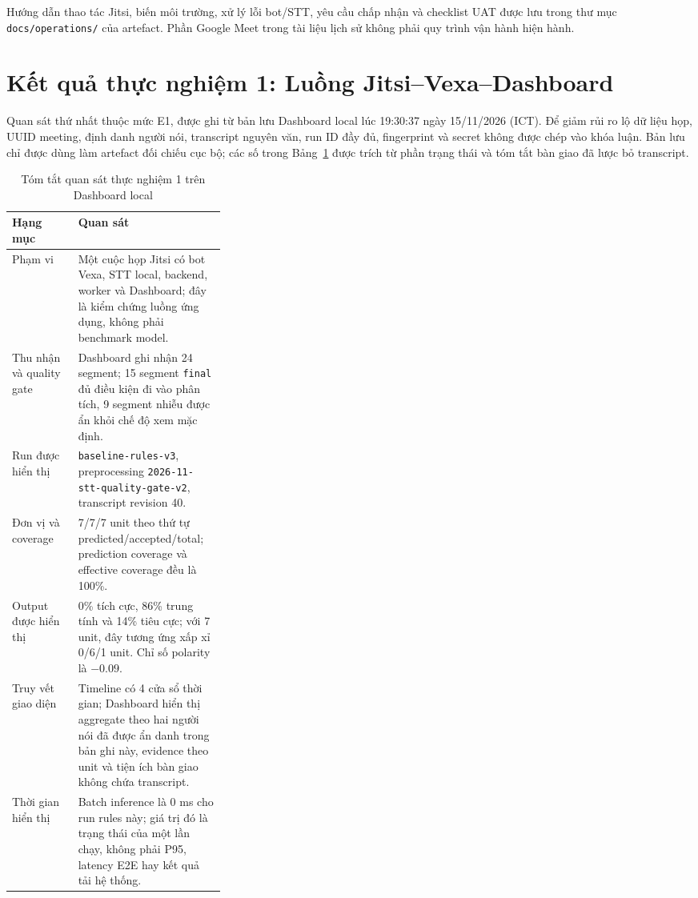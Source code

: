 Hướng dẫn thao tác Jitsi, biến môi trường, xử lý lỗi bot/STT, yêu cầu chấp nhận và checklist UAT được lưu trong thư mục \texttt{docs/operations/} của artefact. Phần Google Meet trong tài liệu lịch sử không phải quy trình vận hành hiện hành.

\section{Kết quả thực nghiệm 1: Luồng Jitsi--Vexa--Dashboard}
\label{sec:experiment-result-01}

Quan sát thứ nhất thuộc mức E1, được ghi từ bản lưu Dashboard local lúc 19:30:37 ngày 15/11/2026 (ICT). Để giảm rủi ro lộ dữ liệu họp, UUID meeting, định danh người nói, transcript nguyên văn, run ID đầy đủ, fingerprint và secret không được chép vào khóa luận. Bản lưu chỉ được dùng làm artefact đối chiếu cục bộ; các số trong Bảng~\ref{tab:experiment-result-01} được trích từ phần trạng thái và tóm tắt bàn giao đã lược bỏ transcript.

\begin{table}[H]
\centering
\caption{Tóm tắt quan sát thực nghiệm 1 trên Dashboard local}
\label{tab:experiment-result-01}
\begin{tabularx}{\linewidth}{p{0.31\linewidth}X}
\toprule
Hạng mục & Quan sát \\ \midrule
Phạm vi & Một cuộc họp Jitsi có bot Vexa, STT local, backend, worker và Dashboard; đây là kiểm chứng luồng ứng dụng, không phải benchmark model. \\
Thu nhận và quality gate & Dashboard ghi nhận 24 segment; 15 segment \texttt{final} đủ điều kiện đi vào phân tích, 9 segment nhiễu được ẩn khỏi chế độ xem mặc định. \\
Run được hiển thị & \texttt{baseline-rules-v3}, preprocessing \texttt{2026-11-stt-quality-gate-v2}, transcript revision 40. \\
Đơn vị và coverage & 7/7/7 unit theo thứ tự predicted/accepted/total; prediction coverage và effective coverage đều là 100\%. \\
Output được hiển thị & 0\% tích cực, 86\% trung tính và 14\% tiêu cực; với 7 unit, đây tương ứng xấp xỉ 0/6/1 unit. Chỉ số polarity là $-0.09$. \\
Truy vết giao diện & Timeline có 4 cửa sổ thời gian; Dashboard hiển thị aggregate theo hai người nói đã được ẩn danh trong bản ghi này, evidence theo unit và tiện ích bàn giao không chứa transcript. \\
Thời gian hiển thị & Batch inference là 0 ms cho run rules này; giá trị đó là trạng thái của một lần chạy, không phải P95, latency E2E hay kết quả tải hệ thống. \\
\bottomrule
\end{tabularx}
\end{table}

